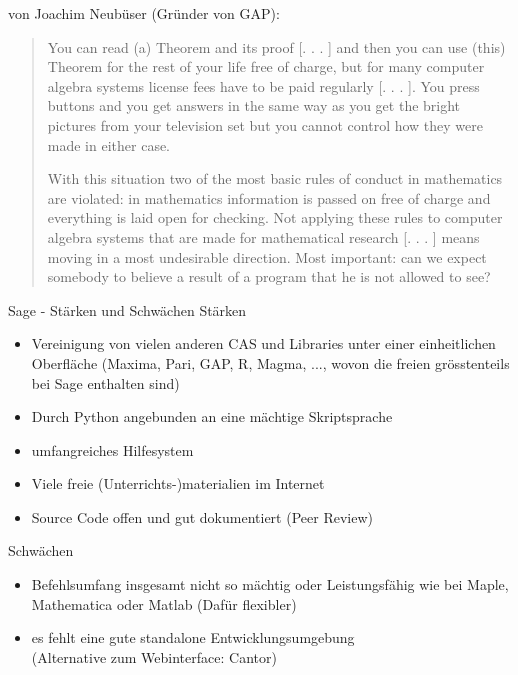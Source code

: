 \documentclass[notes=hide,hyperref={dvipdfmx,pdfpagelabels=false}]{beamer}
\begin{document}
\begin{frame}{}
von Joachim Neubüser (Gründer von GAP):
 \begin{small}
\begin{quote}
    \alert{You can read (a) Theorem and its proof [. . . ] and then
    you can use (this) Theorem for the rest of your life free of
    charge, but for many computer algebra systems license fees
    have to be paid regularly [. . . ]}. You press buttons and you get
    answers in the same way as you get the bright pictures from
    your television set but you cannot control how they were
    made in either case. 

With this situation \alert{two of the most basic rules of conduct in
mathematics are violated: in mathematics information is
passed on free of charge and everything is laid open for
checking}. Not applying these rules to computer algebra
systems that are made for mathematical research [. . . ]
means moving in a most undesirable direction. Most
important: can we expect somebody to believe a result of a
program that he is not allowed to see?  
\end{quote}
 \end{small}

\end{frame}




\begin{frame}[<+->]{Sage - Stärken und Schwächen}
\alert{Stärken}
\begin{itemize}
\item Vereinigung von vielen anderen CAS und Libraries unter einer einheitlichen Oberfläche (Maxima, Pari,
GAP, R, Magma, ..., wovon die freien grösstenteils bei Sage enthalten sind)
\item Durch Python angebunden an eine mächtige Skriptsprache
\item umfangreiches Hilfesystem
\item Viele freie (Unterrichts-)materialien im Internet 
\item Source Code offen und gut dokumentiert (Peer Review)
\end{itemize}
\pause
\alert{Schwächen}
\begin{itemize}
\item Befehlsumfang insgesamt nicht so mächtig oder Leistungsfähig wie bei Maple, Mathematica oder Matlab (Dafür flexibler)
\item es fehlt eine gute standalone Entwicklungsumgebung\\(Alternative zum Webinterface: \alert{Cantor})
\end{itemize}
\end{frame}
\end{document}
